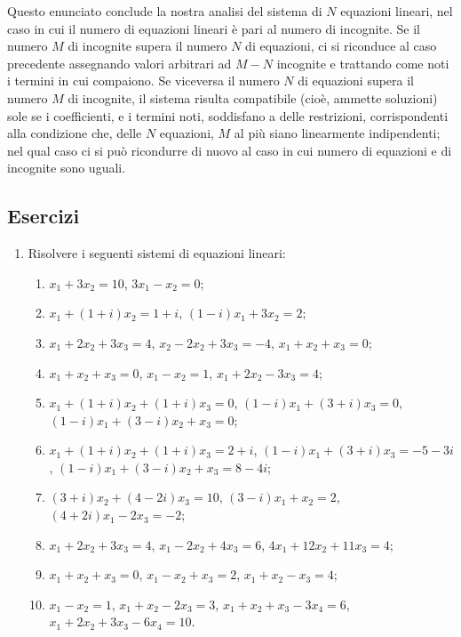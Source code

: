 \documentclass[11pt, a4paper]{book}
\numberwithin{equation}{section}
\newenvironment{esercizi}{\subsection*{Esercizi}\begin{enumerate}}{\end{enumerate}}
\begin{document}
Questo enunciato conclude la nostra analisi del sistema di $N$ equazioni
lineari, nel caso in cui il numero di equazioni lineari è pari al numero di
incognite. Se il numero $M$ di incognite supera il numero $N$ di equazioni,
ci si riconduce al caso precedente assegnando valori arbitrari ad $M-N$
incognite e trattando come noti i termini in cui compaiono. Se viceversa il
numero $N$ di equazioni supera il numero $M$ di incognite, il sistema
risulta compatibile (cioè, ammette soluzioni) sole se i coefficienti, e i
termini noti, soddisfano a delle restrizioni, corrispondenti alla condizione
che, delle $N$ equazioni, $M$ al più siano linearmente indipendenti; nel
qual caso ci si può ricondurre di nuovo al caso in cui numero di equazioni e
di incognite sono uguali.

\begin{esercizi}

\item Risolvere i seguenti sistemi di equazioni lineari:
\begin{enumerate}
  \item $x_1 + 3x_2 = 10$, \quad $3x_1 - x_2 = 0$;
  \item $x_1 + (1+i)x_2 = 1+i$, \quad $(1-i)x_1 + 3x_2 = 2$;
  \item $x_1 + 2x_2 + 3x_3 = 4$, \quad $x_2 - 2x_2 + 3x_3 = -4$,
        \quad $x_1 + x_2 + x_3 = 0$; %
  \item $x_1 + x_2 + x_3 = 0$, \quad $x_1 - x_2 = 1$,
        \quad $x_1 + 2x_2 - 3x_3 = 4$;
  \item $x_1 + (1+i)x_2 + (1+i)x_3 = 0$, \quad
        $(1-i)x_1 + (3+i)x_3 = 0$, \quad
        $(1-i)x_1 + (3-i)x_2 + x_3 = 0$;
  \item $x_1 + (1+i)x_2 + (1+i)x_3 = 2+i$, \quad
        $(1-i)x_1 + (3+i)x_3 = -5-3i$, \quad
        $(1-i)x_1 + (3-i)x_2 + x_3 = 8-4i$; %
  \item $(3+i)x_2 + (4-2i)x_3 = 10$, \quad
        $(3-i)x_1 + x_2 = 2$, \quad
        $(4+2i)x_1 - 2x_3 = -2$;
  \item $x_1 + 2x_2 + 3x_3 = 4$, \quad $x_1 - 2x_2 + 4x_3 = 6$,
        \quad $4x_1 + 12x_2 + 11x_3 = 4$;
  \item $x_1 + x_2 + x_3 = 0$, \quad $x_1 - x_2 + x_3 = 2$,
        \quad $x_1 + x_2 - x_3 = 4$;

  \item $x_1 - x_2 = 1$, \quad $x_1 + x_2 - 2x_3 = 3$,
        \quad $x_1 + x_2 + x_3 - 3x_4 = 6$,
        \quad $x_1 + 2x_2 + 3x_3 - 6x_4 = 10$.
\end{enumerate}


\end{esercizi}
\end{document}
